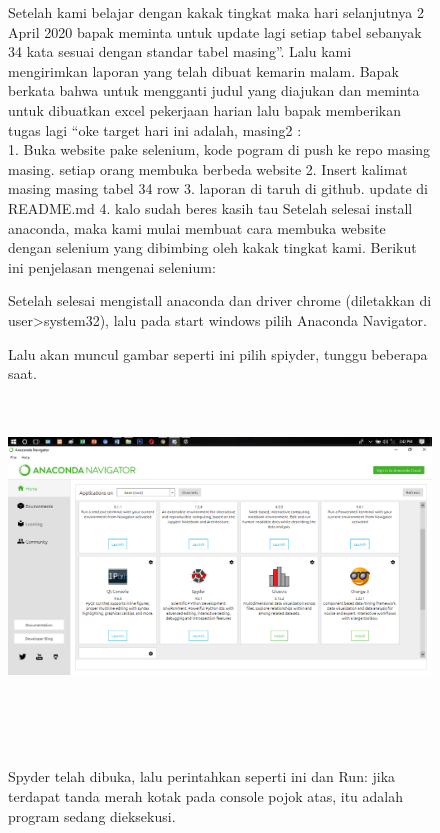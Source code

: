 \documentclass{book}
\begin{document}
\begin{enumerate}
\begin{figure} [ht]
Setelah kami belajar dengan kakak tingkat maka hari selanjutnya 2 April 2020 bapak meminta untuk update lagi setiap tabel sebanyak 34 kata sesuai dengan standar tabel masing”. Lalu kami mengirimkan laporan yang telah dibuat kemarin malam. Bapak berkata bahwa untuk mengganti judul yang diajukan dan meminta untuk dibuatkan excel pekerjaan harian lalu bapak memberikan tugas lagi “oke target hari ini adalah, masing2 :\\
1. Buka website pake selenium, kode pogram di push ke repo masing masing. setiap orang membuka berbeda website
2. Insert kalimat masing masing tabel 34 row
3. laporan di taruh di github. update di README.md 
4. kalo sudah beres kasih tau
	Setelah selesai install anaconda, maka kami mulai membuat cara membuka website dengan selenium yang dibimbing oleh kakak tingkat kami. Berikut ini penjelasan mengenai selenium:\\
    \item Setelah selesai mengistall anaconda dan driver chrome (diletakkan di user>system32), lalu pada start windows pilih Anaconda Navigator.\\
    \item Lalu akan muncul gambar seperti ini pilih spiyder, tunggu beberapa saat.\\
    \centerline{\includegraphics [width=14.94cm, height=8.4cm]{figures/4.1.png}}\\
    \end{figure} \begin{figure}
    \item Spyder telah dibuka, lalu perintahkan seperti ini dan Run: \newline jika terdapat tanda merah kotak pada console pojok atas, itu adalah program sedang dieksekusi.\\

\end{figure}
\end{enumerate}
\end{document}
